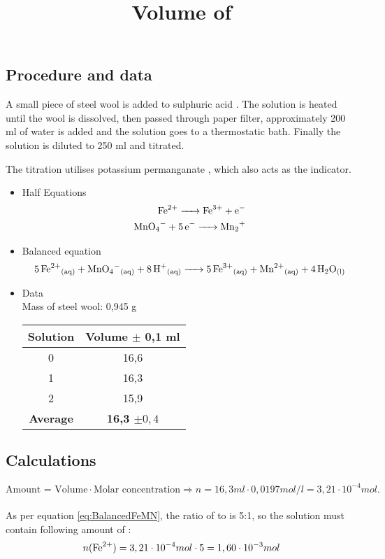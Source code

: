 \documentclass[12pt, a4paper]{article}
\begin{document}
\subsection*{Procedure and data}
A small piece of steel wool is added to sulphuric acid . The solution is heated until the wool is dissolved, then passed through paper filter, approximately 200 ml of water is added and the solution goes to a thermostatic bath.
Finally the solution is diluted to 250 ml and titrated.\par
The titration utilises potassium permanganate , which also acts as the indicator.
\begin{itemize}
\item Half Equations
	\begin{equation*}
	\begin{aligned}
	\ce{Fe^{2+} -> Fe^{3+} + e-} \\
	\ce{MnO4- + 5e- -> Mn2+}
	\end{aligned}
	\end{equation*}
\item Balanced equation
	\begin{equation} \label{eq:BalancedFeMN}
		\ce{
			5Fe^{2+}{}_{(aq)} + MnO4^{-}{}_{(aq)} + 8H+{}_{(aq)}
			->
			5Fe^{3+}{}_{(aq)} + Mn^{2+}{}_{(aq)} + 4H2O{}_{(l)}
		}
	\end{equation}
\item Data \\
Mass of steel wool: 0,945 g
	\begin{center}\title{Volume of }
	\begin{tabular}{|c|c|}
		\hline
		Solution & Volume \ce{KMnO4} $\pm$ 0,1 ml\\
		\hline
		0 & 16,6 \\
		1 & 16,3 \\
		2 & 15,9 \\
		\hline
		\textbf{Average} & \textbf{16,3 $\pm 0,4$} \\
		\hline
	\end{tabular}
\end{center}
\end{itemize}

\subsection*{Calculations}
$$ \text{Amount = Volume} \cdot \text{Molar concentration} \Rightarrow n = 16,3 ml \cdot 0,0197 mol/l = 3,21 \cdot 10^{-4} mol. $$ \\
As per equation \ref{eq:BalancedFeMN}, the ratio of  to  is 5:1, so the solution must contain following amount of :
\begin{equation}
	n(\ce{Fe^{2+}}) = 3,21 \cdot 10^{-4} mol \cdot 5 = 1,60 \cdot 10^{-3} mol
\end{equation}
\end{document}
